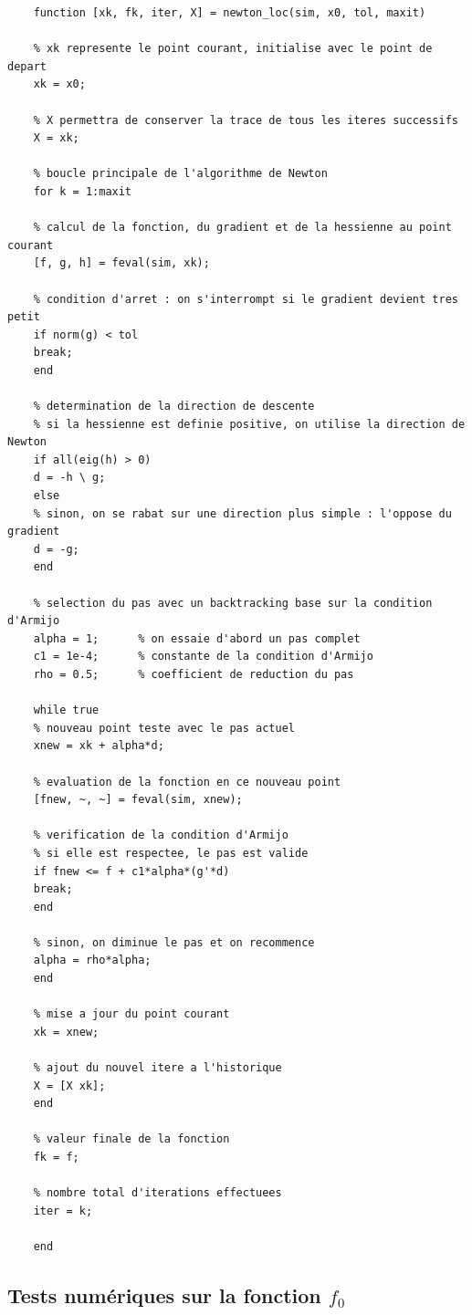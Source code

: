 \documentclass[a4paper,12pt]{article}
\begin{document}
	\begin{verbatim}
	function [xk, fk, iter, X] = newton_loc(sim, x0, tol, maxit)
	
	% xk represente le point courant, initialise avec le point de depart
	xk = x0;
	
	% X permettra de conserver la trace de tous les iteres successifs
	X = xk;
	
	% boucle principale de l'algorithme de Newton
	for k = 1:maxit
	
	% calcul de la fonction, du gradient et de la hessienne au point courant
	[f, g, h] = feval(sim, xk);
	
	% condition d'arret : on s'interrompt si le gradient devient tres petit
	if norm(g) < tol
	break;
	end
	
	% determination de la direction de descente
	% si la hessienne est definie positive, on utilise la direction de Newton
	if all(eig(h) > 0)
	d = -h \ g;
	else
	% sinon, on se rabat sur une direction plus simple : l'oppose du gradient
	d = -g;
	end
	
	% selection du pas avec un backtracking base sur la condition d'Armijo
	alpha = 1;      % on essaie d'abord un pas complet
	c1 = 1e-4;      % constante de la condition d'Armijo
	rho = 0.5;      % coefficient de reduction du pas
	
	while true
	% nouveau point teste avec le pas actuel
	xnew = xk + alpha*d;
	
	% evaluation de la fonction en ce nouveau point
	[fnew, ~, ~] = feval(sim, xnew);
	
	% verification de la condition d'Armijo
	% si elle est respectee, le pas est valide
	if fnew <= f + c1*alpha*(g'*d)
	break;
	end
	
	% sinon, on diminue le pas et on recommence
	alpha = rho*alpha;
	end
	
	% mise a jour du point courant
	xk = xnew;
	
	% ajout du nouvel itere a l'historique
	X = [X xk];
	end
	
	% valeur finale de la fonction
	fk = f;
	
	% nombre total d'iterations effectuees
	iter = k;
	
	end
	\end{verbatim}
	
	\subsection{Tests numériques sur la fonction \(f_0\)}
	
\end{document}
